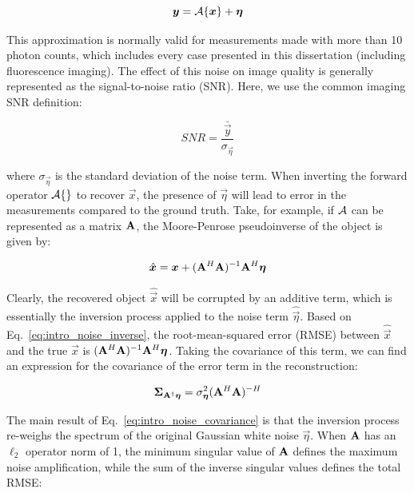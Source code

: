 \begin{equation}\label{eq:intro_forward_model}
    \bm{y} = \mathcal{A}\{\bm{x}\} + \bm{\eta}
\end{equation}

This approximation is normally valid for measurements made with more than 10 photon counts, which includes every case presented in this dissertation (including fluorescence imaging). The effect of this noise on image quality is generally represented as the signal-to-noise ratio (SNR). Here, we use the common imaging SNR definition:

\begin{equation}
    \label{eq:intro_snr}
    SNR = \frac{\bar{\vec{y}}}{\sigma_{\vec{\eta}}}
\end{equation}

\noindent where $\sigma_{\vec{\eta}}$ is the standard deviation of the noise term. When inverting the forward operator $\mathcal{A}\{\}$ to recover $\vec{x}$, the presence of $\vec{\eta}$ will lead to error in the measurements compared to the ground truth. Take, for example, if $\mathcal{A}$ can be represented as a matrix $\mathbf{A}$, the Moore-Penrose pseudoinverse of the object is given by:

\begin{equation}\label{eq:intro_noise_inverse}
        \hat{\bm{\bm{x}}} = \bm{x} + (\mathbf{A}^H \mathbf{A})^{-1} \mathbf{A}^H \bm{\eta}
\end{equation}

\noindent Clearly, the recovered object $\hat{\vec{x}}$ will be corrupted by an additive term, which is essentially the inversion process applied to the noise term $\hat{\vec{\eta}}$. Based on Eq.~\ref{eq:intro_noise_inverse}, the root-mean-squared error (RMSE) between $\hat{\vec{x}}$ and the true $\vec{x}$ is $(\mathbf{A}^H \mathbf{A})^{-1} \mathbf{A}^H \bm{\eta}$. Taking the covariance of this term, we can find an expression for the covariance of the error term in the reconstruction:

\begin{equation}\label{eq:intro_noise_covariance}
    \mathbf{\Sigma}_{\mathbf{A}^{\dagger}\bm{\eta}} = \sigma_{\bm{\eta}}^2 (\mathbf{A}^H \mathbf{A}) ^{-H}
\end{equation}

The main result of Eq.~\ref{eq:intro_noise_covariance} is that the inversion process re-weighs the spectrum of the original Gaussian white noise $\vec{\eta}$. When $\mathbf{A}$ has an $\ell_2$ operator norm of 1, the minimum singular value of $\mathbf{A}$ defines the maximum noise amplification, while the sum of the inverse singular values defines the total RMSE:

